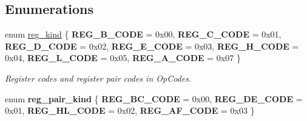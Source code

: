 \subsection*{Enumerations}
\begin{DoxyCompactItemize}
\item 
\mbox{\label{cpu-registers_8h_ae7a73a08aaa7af3cfe957f32ef8af9d3}} 
enum \hyperlink{cpu-registers_8h_ae7a73a08aaa7af3cfe957f32ef8af9d3}{reg\+\_\+kind} \{ \newline
{\bfseries R\+E\+G\+\_\+\+B\+\_\+\+C\+O\+DE} = 0x00, 
{\bfseries R\+E\+G\+\_\+\+C\+\_\+\+C\+O\+DE} = 0x01, 
{\bfseries R\+E\+G\+\_\+\+D\+\_\+\+C\+O\+DE} = 0x02, 
{\bfseries R\+E\+G\+\_\+\+E\+\_\+\+C\+O\+DE} = 0x03, 
\newline
{\bfseries R\+E\+G\+\_\+\+H\+\_\+\+C\+O\+DE} = 0x04, 
{\bfseries R\+E\+G\+\_\+\+L\+\_\+\+C\+O\+DE} = 0x05, 
{\bfseries R\+E\+G\+\_\+\+A\+\_\+\+C\+O\+DE} = 0x07
 \}\begin{DoxyCompactList}\small\item\em Register codes and register pair codes in Op\+Codes. \end{DoxyCompactList}
\item 
\mbox{\label{cpu-registers_8h_acfb92270996ad66c5a9bcff5389416c6}} 
enum {\bfseries reg\+\_\+pair\+\_\+kind} \{ {\bfseries R\+E\+G\+\_\+\+B\+C\+\_\+\+C\+O\+DE} = 0x00, 
{\bfseries R\+E\+G\+\_\+\+D\+E\+\_\+\+C\+O\+DE} = 0x01, 
{\bfseries R\+E\+G\+\_\+\+H\+L\+\_\+\+C\+O\+DE} = 0x02, 
{\bfseries R\+E\+G\+\_\+\+A\+F\+\_\+\+C\+O\+DE} = 0x03
 \}
\end{DoxyCompactItemize}
